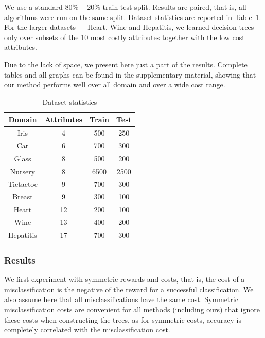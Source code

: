 \documentclass[letterpaper]{article}
\theoremstyle{definition}
\begin{document}
We use a standard $80\%-20\%$ train-test split. Results are paired, that is, all algorithms were run on the same split. Dataset statistics are reported in Table~\ref{tbl:datasets}. For the larger datasets --- Heart, Wine and Hepatitis, we learned decision trees only over subsets of the 10 most costly attributes together with the low cost attributes.

Due to the lack of space, we present here just a part of the results. Complete tables and all graphs can be found in the supplementary material, showing that our method performs well over all domain and over a wide cost range.

\begin{table}[ht]
\centering
\footnotesize
\begin{tabular}{|c|c|c|c|}
\hline
 	Domain & Attributes&	Train	&Test \\ \hline
Iris&	4&	500&	250\\
Car&	6	&700&	300\\




Glass&	8&	500	&200\\




Nursery&	8&	6500&	2500\\

Tictactoe&	9&	700&	300\\
Breast&	9&	300&	100\\

Heart&	12&	200	&100\\
Wine&	13&	400&	200\\
Hepatitis&	17&	700&	300\\\hline

\end{tabular}
\caption{Dataset statistics}
\label{tbl:datasets}
\end{table}

\subsubsection{Results}

We first experiment with symmetric rewards and costs, that is, the cost of a misclassification is the negative of the reward for a successful classification. We also assume here that all misclassifications have the same cost.
Symmetric misclassification costs are convenient for all methods (including ours) that ignore these costs when constructing the trees, as for symmetric costs, accuracy is completely correlated with the misclassification cost.
\end{document}
